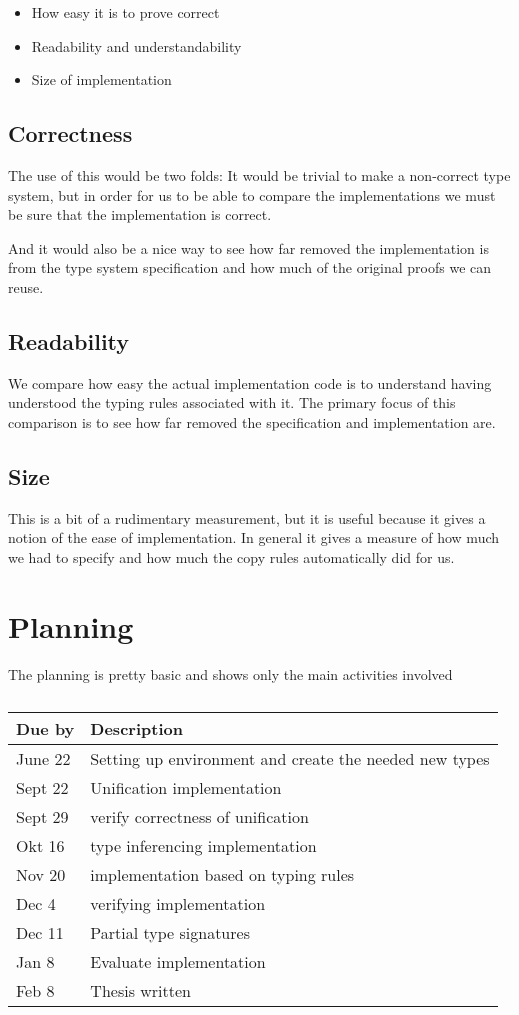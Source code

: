 \documentclass[12pt, a4paper, oneside]{article}
\begin{document}
\begin{itemize}
\item How easy it is to prove correct
\item Readability and understandability
\item Size of implementation
\end{itemize}

\subsection{Correctness}
The use of this would be two folds:
It would be trivial to make a non-correct type system, but in order for us to be able to compare the implementations we must be sure that the implementation is correct.

And it would also be a nice way to see how far removed the implementation is from the type system specification and how much of the original proofs we can reuse.

\subsection{Readability}
We compare how easy the actual implementation code is to understand having understood the typing rules associated with it. The primary focus of this comparison is to see how far removed the specification and implementation are.

\subsection{Size}
This is a bit of a rudimentary measurement, but it is useful because it gives a notion of the ease of implementation. In general it gives a measure of how much we had to specify and how much the copy rules automatically did for us.

\section{Planning}
The planning is pretty basic and shows only the main activities involved
\begin{table}[h]
\centering
\begin{tabular}{ | l | l |}
\hline
\textbf{Due by} & \textbf{Description} \\
\hline
June 22 & Setting up environment and create the needed new types  \\
Sept 22 & Unification implementation\\
Sept 29 & verify correctness of unification \\
Okt 16 & type inferencing implementation\\
Nov 20 & implementation based on typing rules\\
Dec 4  & verifying implementation \\
Dec 11 & Partial type signatures \\
Jan 8 & Evaluate implementation \\
Feb 8 & Thesis written\\
\hline
\end{tabular}
\caption{}
\label{Rough partial planning}
\end{table}
\end{document}
